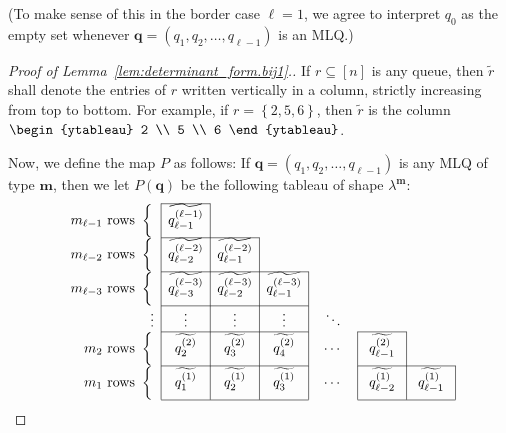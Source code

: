 \documentclass[reqno]{amsart}
\newcommand{\0}{\phantom{c}}
\newcommand{\mm}{\mathbf{m}}
\newcommand{\qq}{\mathbf{q}}
\newcommand{\set}[1]{\left\{ #1 \right\}}
\newcommand{\tup}[1]{\left( #1 \right)}
\newcommand{\ive}[1]{\left[ #1 \right]}
\theoremstyle{plain}
\theoremstyle{definition}
\numberwithin{equation}{section}
\begin{document}
(To make sense of this in the border case $\ell = 1$, we agree to interpret $q_0$ as the empty set whenever $\qq = \tup{q_1, q_2, \dotsc, q_{\ell-1}}$ is an MLQ.)

\begin{proof}[Proof of Lemma~\ref{lem:determinant_form.bij1}.]
If $r \subseteq \ive{n}$ is any queue, then $\widetilde{r}$ shall denote the entries of $r$ written vertically in a column, strictly increasing from top to bottom.
For example, if $r = \set{2,5,6}$, then $\widetilde{r}$ is the column $\begin{ytableau} 2 \\ 5 \\ 6 \end{ytableau}$.

Now, we define the map $P$ as follows: If $\qq = \tup{q_1, q_2, \dotsc, q_{\ell-1}}$ is any MLQ of type $\mm$, then we let $P(\qq)$ be the following tableau of shape $\lambda^{\mm}$:
\begin{equation}
\label{pf.lem:determinant_form.bij1.visual}
\begin{array}[c]{r|c|ccc@{\hspace{30pt}}c@{\hspace{35pt}}c@{\hspace{35pt}}}
\cline{2-2}%
m_{\ell-1} \text{ rows } \left\{ \vphantom{\dfrac{2^2}{2^2}}\right.
    & \widetilde{q_{\ell-1}^{(\ell-1)}} &  &  &  &  & \\\cline{2-3}
m_{\ell-2} \text{ rows } \left\{ \vphantom{\dfrac{2^2}{2^2}}\right.
    & \widetilde{q_{\ell-2}^{(\ell-2)}} & \widetilde{q_{\ell-1}^{(\ell-2)}} & \multicolumn{1}{|c}{} &  &  & \\\cline{2-4}
m_{\ell-3} \text{ rows } \left\{  \vphantom{\dfrac{2^2}{2^2}}\right.
    & \widetilde{q_{\ell-3}^{(\ell-3)}} & \widetilde{q_{\ell-2}^{(\ell-3)}} & \multicolumn{1}{|c}{\widetilde{q_{\ell-1}^{(  \ell-3)}}} & \multicolumn{1}{|c}{} &  & \\\cline{2-4}%
\vdots & \mathbf{\vdots} & \mathbf{\vdots} & \multicolumn{1}{|c}{\vdots} & \multicolumn{1}{|c}{\ddots} &  & \\\cline{2-4}\cline{6-6}
m_2 \text{ rows } \left\{  \vphantom{\dfrac{2^2}{2^2}}\right.
    & \widetilde{q_2^{(2)}} & \widetilde{q_{3}^{(2)}} & \multicolumn{1}{|c}{\widetilde{q_{4}^{(2)}}} & \multicolumn{1}{|c}{\cdots} & \multicolumn{1}{|c}{\widetilde{q_{\ell-1}^{(2)}}} & \multicolumn{1}{|c}{}\\\cline{2-4}\cline{6-7}
m_1 \text{ rows } \left\{ \vphantom{\dfrac{2^2}{2^2}}\right.
    & \widetilde{q_1^{(1)}} & \widetilde{q_2^{(1)}} & \multicolumn{1}{|c}{\widetilde{q_{3}^{(1)}}} & \multicolumn{1}{|c}{\cdots} & \multicolumn{1}{|c}{\widetilde{q_{\ell-2}^{(1)}}} & \multicolumn{1}{|c|}{\widetilde{q_{\ell-1}^{(1)}}}\\\cline{2-4}\cline{6-7}

\end{array}
\end{equation}
\end{proof}
\end{document}
